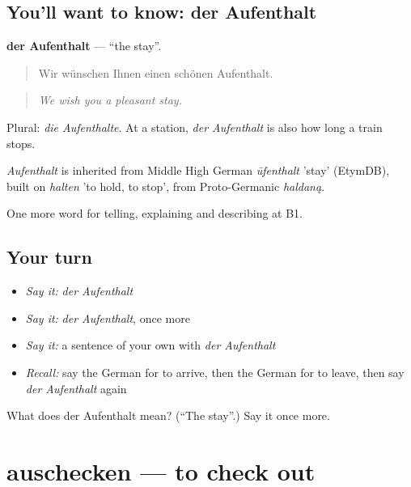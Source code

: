 \subsection*{You'll want to know: der Aufenthalt}
\textbf{der Aufenthalt} — \textquotedblleft{}the stay\textquotedblright{}.

\begin{quote}
Wir wünschen Ihnen einen schönen Aufenthalt.
\end{quote}

\begin{quote}
\emph{We wish you a pleasant stay.}
\end{quote}

Plural: \emph{die Aufenthalte}. At a station, \emph{der Aufenthalt} is also how long a train stops.

\begin{cousinweb}
\emph{Aufenthalt} is inherited from Middle High German \emph{ūfenthalt} 'stay' (EtymDB), built on \emph{halten} 'to hold, to stop', from Proto-Germanic \emph{haldaną}.
\end{cousinweb}

\begin{grammarlens}[title={What you've built}]
One more word for telling, explaining and describing at B1.
\end{grammarlens}

\subsection*{Your turn}
\begin{itemize}
\raggedright
  \item \emph{Say it:} \emph{der Aufenthalt}
  \item \emph{Say it:} \emph{der Aufenthalt}, once more
  \item \emph{Say it:} a sentence of your own with \emph{der Aufenthalt}
  \item \emph{Recall:} say the German for to arrive, then the German for to leave, then say \emph{der Aufenthalt} again
\end{itemize}

\begin{tcolorbox}[breakable,colback=teal!4,colframe=teal!35!black,title={Before you move on}]
What does der Aufenthalt mean? (\textquotedblleft{}The stay\textquotedblright{}.) Say it once more.
\end{tcolorbox}
\section[auschecken]{auschecken — to check out}

